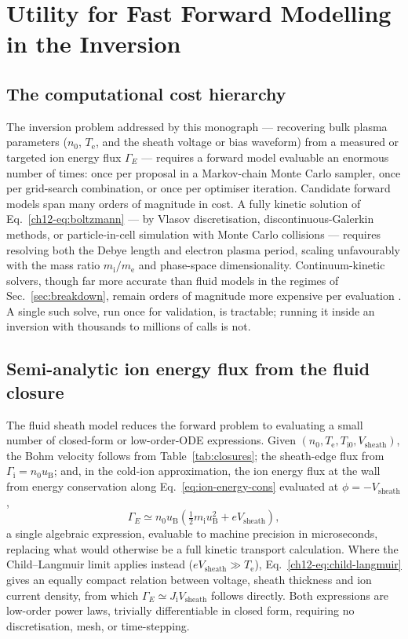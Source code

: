 \section{Utility for Fast Forward Modelling in the Inversion}
\label{sec:forward}

\subsection{The computational cost hierarchy}

The inversion problem addressed by this monograph — recovering bulk plasma parameters ($n_0$, $T_{\mathrm{e}}$, and the sheath voltage or bias waveform) from a measured or targeted ion energy flux $\Gamma_E$ — requires a forward model evaluable an enormous number of times: once per proposal in a Markov-chain Monte Carlo sampler, once per grid-search combination, or once per optimiser iteration. Candidate forward models span many orders of magnitude in cost. A fully kinetic solution of Eq.~\eqref{ch12-eq:boltzmann} — by Vlasov discretisation, discontinuous-Galerkin methods, or particle-in-cell simulation with Monte Carlo collisions — requires resolving both the Debye length and electron plasma period, scaling unfavourably with the mass ratio $m_{\mathrm{i}}/m_{\mathrm{e}}$ and phase-space dimensionality. Continuum-kinetic solvers, though far more accurate than fluid models in the regimes of Sec.~\ref{sec:breakdown}, remain orders of magnitude more expensive per evaluation \cite{ref0659,ref0665,ref0666}. A single such solve, run once for validation, is tractable; running it inside an inversion with thousands to millions of calls is not.

\subsection{Semi-analytic ion energy flux from the fluid closure}

The fluid sheath model reduces the forward problem to evaluating a small number of closed-form or low-order-ODE expressions. Given $(n_0, T_{\mathrm{e}}, T_{\mathrm{i}0}, V_{\text{sheath}})$, the Bohm velocity follows from Table~\ref{tab:closures}; the sheath-edge flux from $\Gamma_{\mathrm{i}} = n_0u_{\mathrm{B}}$; and, in the cold-ion approximation, the ion energy flux at the wall from energy conservation along Eq.~\eqref{eq:ion-energy-cons} evaluated at $\phi=-V_{\text{sheath}}$,
\begin{equation}
\Gamma_E \simeq n_0u_{\mathrm{B}}\left(\tfrac{1}{2}m_{\mathrm{i}}u_{\mathrm{B}}^2 + eV_{\text{sheath}}\right),
\label{eq:GammaE-forward}
\end{equation}
a single algebraic expression, evaluable to machine precision in microseconds, replacing what would otherwise be a full kinetic transport calculation. Where the Child--Langmuir limit applies instead ($eV_{\text{sheath}}\gg T_{\mathrm{e}}$), Eq.~\eqref{ch12-eq:child-langmuir} gives an equally compact relation between voltage, sheath thickness and ion current density, from which $\Gamma_E \simeq J_{\mathrm{i}}V_{\text{sheath}}$ follows directly. Both expressions are low-order power laws, trivially differentiable in closed form, requiring no discretisation, mesh, or time-stepping.

